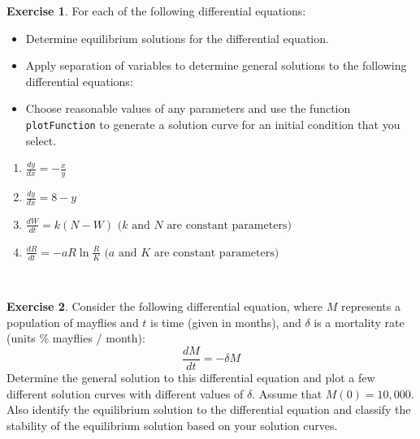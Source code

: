 \documentclass[
]{book}
\theoremstyle{definition}
\theoremstyle{definition}
\theoremstyle{definition}
\newtheorem{exercise}{Exercise}[chapter]
\theoremstyle{remark}
\begin{document}
\begin{exercise}
\protect\hypertarget{exr:unnamed-chunk-129}{}{\label{exr:unnamed-chunk-129} }For each of the following differential equations:

\begin{itemize}
\item Determine equilibrium solutions for the differential equation.
\item Apply separation of variables to determine general solutions to the following differential equations:
\item Choose reasonable values of any parameters and use the function \texttt{plotFunction} to generate a solution curve for an initial condition that you select.
\end{itemize}

\begin{enumerate}
\item $\displaystyle \frac{dy}{dx} = -\frac{x}{y} $
\item $\displaystyle \frac{dy}{dx} = 8-y $
\item $\displaystyle \frac{dW}{dt} = k (N-W)  \mbox{ ($k$ and $N$ are constant parameters) } $
\item $\displaystyle \frac{dR}{dt} =-aR \ln \frac{R}{K}  \mbox{ ($a$ and $K$ are constant parameters) } $
\end{enumerate}
\end{exercise}

~

\begin{exercise}
\protect\hypertarget{exr:unnamed-chunk-130}{}{\label{exr:unnamed-chunk-130} }Consider the following differential equation, where \(M\) represents a population of mayflies and \(t\) is time (given in months), and \(\delta\) is a mortality rate (units \% mayflies / month):
\begin{equation}
\frac{dM}{dt} = - \delta M
\end{equation}
Determine the general solution to this differential equation and plot a few different solution curves with different values of \(\delta\). Assume that \(M(0) = 10,000\). Also identify the equilibrium solution to the differential equation and classify the stability of the equilibrium solution based on your solution curves.
\end{exercise}
\end{document}
